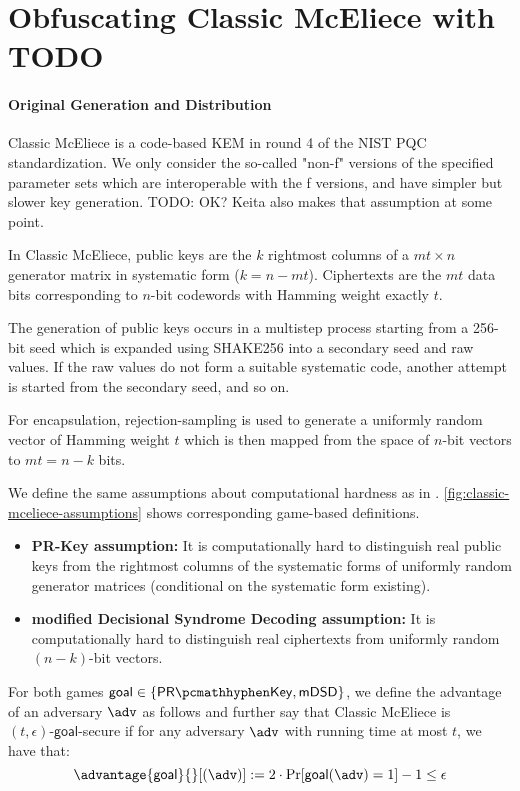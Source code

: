 \section{Obfuscating Classic McEliece with TODO} \label{sec:obfuscating-classic-mceliece}

\paragraph{Original Generation and Distribution}
Classic McEliece \cite{NISTPQC-R4:ClassicMcEliece22} is a code-based KEM in round 4 of the NIST PQC standardization. We only consider the so-called "non-f" versions of the specified parameter sets which are interoperable with the f versions, and have simpler but slower key generation. TODO: OK? Keita also makes that assumption at some point.

In Classic McEliece, public keys are the $k$ rightmost columns of a $mt \times n$ generator matrix in systematic form ($k = n - mt$). Ciphertexts are the $mt$ data bits corresponding to $n$-bit codewords with Hamming weight exactly $t$.

The generation of public keys occurs in a multistep process starting from a 256-bit seed which is expanded using SHAKE256 into a secondary seed and raw values. If the raw values do not form a suitable systematic code, another attempt is started from the secondary seed, and so on.

For encapsulation, rejection-sampling is used to generate a uniformly random vector of Hamming weight $t$ which is then mapped from the space of $n$-bit vectors to $mt=n-k$ bits.

We define the same assumptions about computational hardness as in \cite[Definition~K.1]{EC:Xagawa22}. \cref{fig:classic-mceliece-assumptions} shows corresponding game-based definitions.
\begin{itemize}
    \item \textbf{PR-Key assumption:} It is computationally hard to distinguish real public keys from the rightmost columns of the systematic forms of uniformly random generator matrices (conditional on the systematic form existing).
    \item \textbf{modified Decisional Syndrome Decoding assumption:} It is computationally hard to distinguish real ciphertexts from uniformly random $(n-k)$-bit vectors.
\end{itemize}

For both games $\textsf{goal} \in \{\prkey, \mdsd\}$, we define the advantage of an adversary $\adv$ as follows and further say that Classic McEliece is $(t, \epsilon)\textsf{-goal}$-secure if for any adversary $\adv$ with running time at most $t$, we have that:
\[ \advantage{\textsf{goal}}{}[(\adv)] := 2 \cdot \Pr[\textsf{goal}(\adv) = 1] - 1 \leq \epsilon \]

